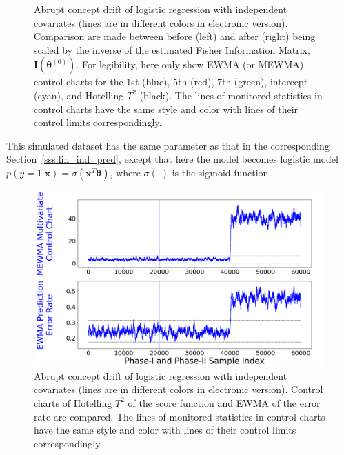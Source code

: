 \documentclass[twoside,11pt]{article}
\begin{document}
\begin{enumerate}[(I)]
\begin{figure}[!htbp]
  \caption{Abrupt concept drift of logistic regression with independent {covariates} (lines are in different colors in electronic version). Comparison are made between before (left) and after (right) being scaled by {the inverse of the estimated} Fisher Information Matrix, {$\mathbf {I} ( {\bm{\theta}} ^{(0)})$.} For legibility, here only show EWMA (or MEWMA) control charts for the $1$st (blue), $5$th (red), $7$th (green), intercept (cyan), and Hotelling $T^2$ (black). The lines of monitored statistics in control charts have the same style and color with lines of their control limits correspondingly.}
  \label{fig:log_reg_ind_X}
\end{figure}

This simulated dataset has the same parameter as that in the corresponding Section~\ref{sss:lin_ind_pred}, except that here the model becomes {logistic model} {$p(y=1|\bm {x})= \sigma (\bm {x}^T\bm { \theta})$,} where $\sigma (\cdot)$ is the sigmoid function.
\begin{figure}[!htbp]
\centering
\includegraphics[width = 0.6\linewidth]{../figures/v14/sim_5/logi_no_muco/1_sim5_logi_1e-08_0_005_1.png}
  \caption{Abrupt concept drift of logistic regression with independent covariates (lines are in different colors in electronic version). Control charts of Hotelling $T^2$ of the score function and EWMA of the error rate are compared. The lines of monitored statistics in control charts have the same style and color with lines of their control limits correspondingly.}
  \label{fig:log_reg_ind_X_comp}
\end{figure}


\end{enumerate}
\end{document}
